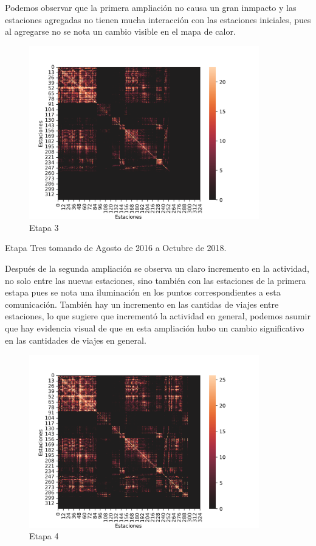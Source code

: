 \documentclass[
]{article}
\begin{document}
Podemos observar que la primera ampliación no causa un gran inmpacto y
las estaciones agregadas no tienen mucha interacción con las estaciones
iniciales, pues al agregarse no se nota un cambio visible en el mapa de
calor.

\begin{figure}[h]
\centering
\includegraphics[width=10cm]{../plots/resultsTres.png}
\caption{Etapa 3}
\end{figure}

Etapa Tres tomando de Agosto de 2016 a Octubre de 2018.

Después de la segunda ampliación se observa un claro incremento en la
actividad, no solo entre las nuevas estaciones, sino también con las
estaciones de la primera estapa pues se nota una iluminación en los
puntos correspondientes a esta comunicación. También hay un incremento
en las cantidas de viajes entre estaciones, lo que sugiere que
incrementó la actividad en general, podemos asumir que hay evidencia
visual de que en esta ampliación hubo un cambio significativo en las
cantidades de viajes en general.

\begin{figure}[h]
\centering
\includegraphics[width=10cm]{../plots/resultsCuatro.png}
\caption{Etapa 4}
\end{figure}
\end{document}
